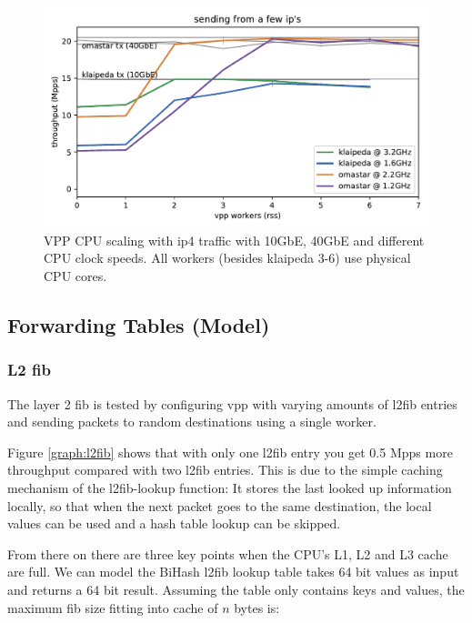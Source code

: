 \begin{figure}[!ht]
\noindent\hspace{0.5mm}\includegraphics[width=\linewidth]{pics/throughput_summary_multicore.pdf}
\caption{VPP CPU scaling with \Ac{ip4} traffic with 10GbE, 40GbE and different CPU clock speeds. All workers (besides klaipeda 3-6) use physical CPU cores. }
\label{graph:multicore}
\end{figure}


\subsection{Forwarding Tables (Model)}



\subsubsection{L2 \Ac{fib}}

The layer 2 \Ac{fib} is tested by configuring \Ac{vpp} with varying
amounts of l2fib entries and sending packets to random destinations
using a single worker.

Figure \ref{graph:l2fib} shows that with only one l2fib entry you get
0.5 Mpps more throughput compared with two l2fib entries. This is due
to the simple caching mechanism of the l2fib-lookup function: It
stores the last looked up information locally, so that when the next
packet goes to the same destination, the local values can be used and
a hash table lookup can be skipped.

From there on there are three key points when the CPU's L1, L2 and L3
cache are full. We can model the BiHash l2fib lookup table takes 64
bit values as input and returns a 64 bit result. Assuming the table
only contains keys and values, the maximum \Ac{fib} size fitting into
cache of $n$ bytes is:

